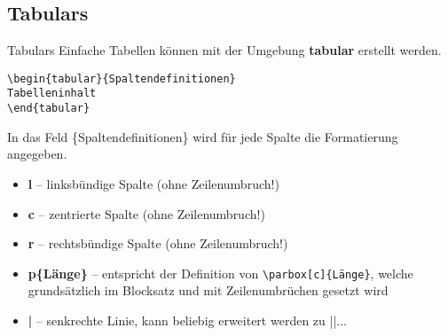 \subsection{Tabulars}
\begin{frame}[fragile]{Tabulars}
Einfache Tabellen können mit der Umgebung \textbf{tabular} erstellt werden.
\begin{lstlisting}[style=tex]
\begin{tabular}{Spaltendefinitionen}
Tabelleninhalt
\end{tabular}
\end{lstlisting}

In das Feld \{Spaltendefinitionen\} wird für jede Spalte die Formatierung angegeben. \\

\begin{itemize}
	\item \textbf{l} -- linksbündige Spalte (ohne Zeilenumbruch!) 
	\item \textbf{c} -- zentrierte Spalte (ohne Zeilenumbruch!)
	\item \textbf{r} -- rechtsbündige Spalte (ohne Zeilenumbruch!)
	\item \textbf{p\{Länge\}} -- entspricht der Definition von \texttt{\textbackslash parbox[c]\{Länge\}}, welche grundsätzlich im Blocksatz und mit Zeilenumbrüchen gesetzt wird
	\item \textbf{|} -- senkrechte Linie, kann beliebig erweitert werden zu ||...
\end{itemize}
\end{frame}

